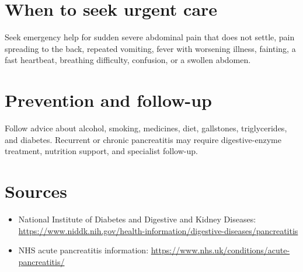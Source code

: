 \section*{When to seek urgent care}
Seek emergency help for sudden severe abdominal pain that does not settle, pain spreading to the back, repeated vomiting, fever with worsening illness, fainting, a fast heartbeat, breathing difficulty, confusion, or a swollen abdomen.

\section*{Prevention and follow-up}
Follow advice about alcohol, smoking, medicines, diet, gallstones, triglycerides, and diabetes. Recurrent or chronic pancreatitis may require digestive-enzyme treatment, nutrition support, and specialist follow-up.

\section*{Sources}
\begin{itemize}
\item National Institute of Diabetes and Digestive and Kidney Diseases: \url{https://www.niddk.nih.gov/health-information/digestive-diseases/pancreatitis}
\item NHS acute pancreatitis information: \url{https://www.nhs.uk/conditions/acute-pancreatitis/}
\end{itemize}

